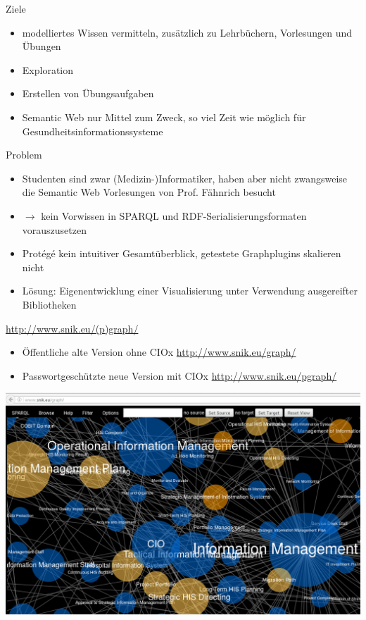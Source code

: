 \documentclass[14pt,aspectratio=1610]{beamer}
\begin{document}
\begin{frame}{Ziele}
\begin{itemize}
\item modelliertes Wissen vermitteln, zusätzlich zu Lehrbüchern, Vorlesungen und Übungen
\item Exploration 
\item Erstellen von Übungsaufgaben
\item Semantic Web nur Mittel zum Zweck, so viel Zeit wie möglich für Gesundheitsinformationssysteme 
\end{itemize}
\end{frame}

\begin{frame}{Problem}
\begin{itemize}
\item Studenten sind zwar (Medizin-)Informatiker, haben aber nicht zwangsweise die Semantic Web Vorlesungen von Prof. Fähnrich besucht
\item $\rightarrow$ kein Vorwissen in SPARQL und RDF-Serialisierungsformaten vorauszusetzen
\item Protégé kein intuitiver Gesamtüberblick, getestete Graphplugins skalieren nicht
\item Lösung: Eigenentwicklung einer Visualisierung unter Verwendung ausgereifter Bibliotheken
\end{itemize}
\end{frame}

\begin{frame}{\url{http://www.snik.eu/(p)graph/}}
\begin{itemize}
\item Öffentliche alte Version ohne CIOx \url{http://www.snik.eu/graph/}
\item Passwortgeschützte neue Version mit CIOx \url{http://www.snik.eu/pgraph/}
\end{itemize}
\end{frame}

\begin{frame}{}
\centering\includegraphics[width=1.05\textwidth,height=1.05\textheight,keepaspectratio]{img/browser.png}
\end{frame}
\end{document}
